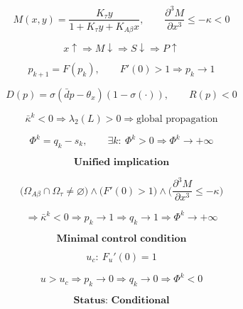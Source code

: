 \documentclass[11pt]{article}
\begin{document}
\[
M(x,y)=\frac{K_\tau y}{1+K_\tau y+K_{A\beta}x},\qquad
\frac{\partial^3 M}{\partial x^3}\le -\kappa<0
\]

\[
x\uparrow \Rightarrow M\downarrow \Rightarrow S\downarrow \Rightarrow P\uparrow
\]

\[
p_{k+1}=F(p_k),\qquad
F'(0)>1 \Rightarrow p_k\to 1
\]

\[
D(p)=\sigma(\bar d p-\theta_x)(1-\sigma(\cdot)),\qquad
R(p)<0
\]

\[
\bar\kappa^k<0 \Rightarrow \lambda_2(L)>0 \Rightarrow \text{global propagation}
\]

\[
\Phi^k = q_k - s_k,\qquad
\exists k:\ \Phi^k>0 \Rightarrow \Phi^k\to +\infty
\]

\[
\textbf{Unified implication}
\]

\[
\Big(\Omega_{A\beta}\cap\Omega_\tau\neq\varnothing\Big)
\land
\Big(F'(0)>1\Big)
\land
\Big(\frac{\partial^3 M}{\partial x^3}\le -\kappa\Big)
\]

\[
\Rightarrow
\bar\kappa^k<0
\Rightarrow
p_k\to 1
\Rightarrow
q_k\to 1
\Rightarrow
\Phi^k\to +\infty
\]

\[
\textbf{Minimal control condition}
\]

\[
u_c:\ F_u'(0)=1
\]

\[
u>u_c \Rightarrow p_k\to 0 \Rightarrow q_k\to 0 \Rightarrow \Phi^k<0
\]

\[
\textbf{Status: Conditional}
\]
\end{document}
